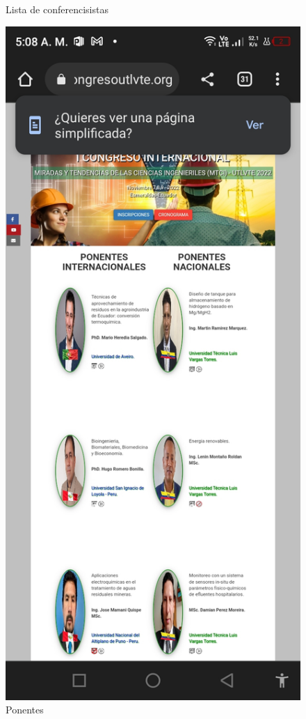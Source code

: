 \documentclass[a4paper,14px]{article}
\begin{document}
\begin{minipage}[H]{0.5\linewidth}
\begin{figure}[H]
    \caption{Lista de conferencisistas}
    \label{fig:conferensistas}
  \end{figure}
\end{minipage}
\hspace{0.5cm}
\begin{minipage}[H]{0.5\linewidth}
  \begin{figure}[H]
    \centering
    \includegraphics[scale=0.3]{ponentes.jpg}
    \caption{Ponentes}
    \label{fig:ponentes}
  \end{figure}
\end{minipage}
\end{document}
